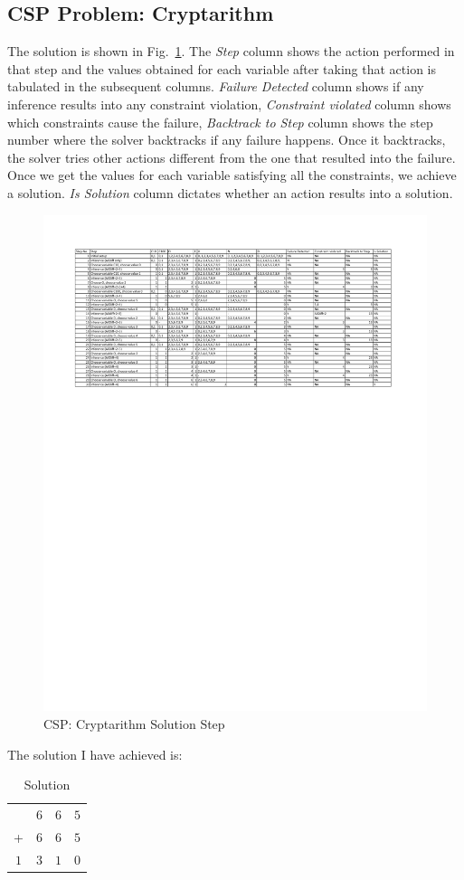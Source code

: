 \subsection*{CSP Problem: Cryptarithm}
The solution is shown in Fig.~\ref{fig:csp_mrv}. The \textit{Step} column shows the action performed in that step and the values obtained for each variable after taking that action is tabulated in the subsequent columns. \textit{Failure Detected} column shows if any inference results into any constraint violation, \textit{Constraint violated} column shows which constraints cause the failure, \textit{Backtrack to Step} column shows the step number where the solver backtracks if any failure happens. Once it backtracks, the solver tries other actions different from the one that resulted into the failure. Once we get the values for each variable satisfying all the constraints, we achieve a solution. \textit{Is Solution} column dictates whether an action results into a solution.
\begin{figure}[!h]
	\centering
	\includegraphics[angle=0,scale=1.0,trim={1.5cm 18cm 2cm 1.5cm},clip]{./csp_mrv.pdf}
	\caption{CSP: Cryptarithm Solution Step}
	\label{fig:csp_mrv}
\end{figure}

The solution I have achieved is:
\begin{table}[!h]
	\renewcommand{\arraystretch}{1.2}
	\centering
	\caption{Solution}
	\label{tbl:b_savings}
	\begin{tabular}{cccc} 
		\hline
		&$6$&$6$&$5$\\
		+&$6$&$6$&$5$\\
		\hline
		$1$&$3$&$1$&$0$\\
		\hline
	\end{tabular}
\end{table}